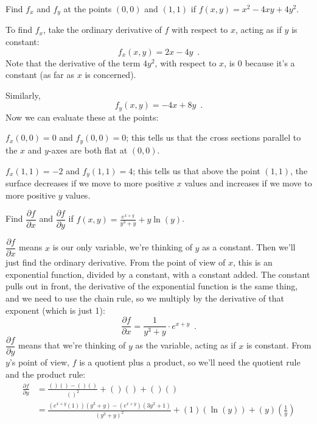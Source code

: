 \begin{example}
Find $f_x$ and $f_y$ at the points $(0, 0)$ and $(1, 1)$ if $f(x,y)=x^2-4xy+4y^2$.

\begin{solution}
  To find $f_x$, take the ordinary derivative of $f$ with respect to $x$, acting as if $y$ is constant:
$$f_x(x,y)=2x-4y \enspace .$$
Note that the derivative of the term $4y^2$, with respect to $x$, is $0$ because it's a constant (as far as $x$ is concerned).

Similarly,
$$f_y(x,y)=-4x+8y \enspace .$$
Now we can evaluate these at the points:

$f_x(0,0)=0$ and $f_y(0,0)=0$; this tells us that the cross sections parallel to the $x$ and $y$-axes are both flat at $(0,0)$.

$f_x(1,1)=-2$ and $f_y(1,1)=4$; this tells us that above the point $(1, 1)$, the surface decreases if we move to more positive $x$ values and increases if we move to more positive $y$ values.
\end{solution}\end{example}

\begin{example}
  \label{ex:4-partials}
Find $\dfrac{\partial f}{\partial x}$ and $\dfrac{\partial f}{\partial y}$ if $f(x,y)=\frac{e^{x+y}}{y^3+y} + y\ln(y)$.

\begin{solution}
  $\dfrac{\partial f}{\partial x}$ means $x$ is our only variable, we're thinking of $y$ as a constant. Then we'll just find the ordinary derivative. From the point of view of $x$, this is an exponential function, divided by a constant, with a constant added. The constant pulls out in front, the derivative of the exponential function is the same thing, and we need to use the chain rule, so we multiply by the derivative of that exponent (which is just 1):
$$\frac{\partial f}{\partial x} = \frac{1}{y^3+y}\cdot e^{x+y} \enspace .$$
$\dfrac{\partial f}{\partial y}$ means that we're thinking of $y$ as the variable, acting as if $x$ is constant. From $y$'s point of view, $f$ is a quotient plus a product, so we'll need the quotient rule and the product rule:
\begin{align*}
\frac{\partial f}{\partial y} &= \frac{( )( )-( )( )}{( )^2}+( )( )+( )( ) \\
 &= \frac{\left(e^{x+y}(1)\right)(y^3+y)-\left(e^{x+y}\right)(3y^2+1)}{(y^3+y)^2}+(1)(\ln(y))+(y)\left(\frac{1}{y}\right)
\end{align*}
\end{solution}\end{example}

